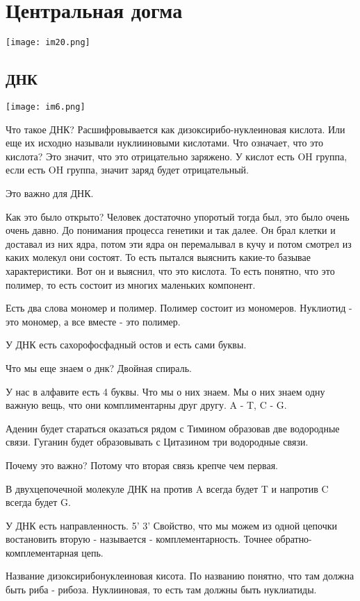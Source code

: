 \section{Центральная догма}

\texttt{[image: im20.png]}

\subsection{ДНК}
\texttt{[image: im6.png]}

Что такое ДНК? Расшифровывается как
дизоксирибо-нуклеиновая кислота. Или еще 
их исходно называли нуклииновыми кислотами. Что означает, что 
это кислота? Это значит, что это отрицательно заряжено. У кислот есть 
OH группа, если есть OH группа, значит заряд будет отрицательный.

Это важно для ДНК.

Как это было открыто? Человек достаточно упоротый тогда был, это было очень очень давно.
До понимания процесса генетики и так далее. Он брал клетки и доставал из
них ядра, потом эти ядра он перемалывал в кучу и потом
смотрел из каких молекул они состоят. То есть пытался выяснить какие-то
базывае характеристики. Вот он и выяснил, что это кислота. То есть понятно,
что это полимер, то есть состоит из многих маленьких компонент.

Есть два слова мономер и полимер. Полимер состоит из мономеров. 
Нуклиотид - это мономер, а все вместе - это полимер.

У ДНК есть сахорофосфадный остов и есть сами буквы.

Что мы еще знаем о днк? Двойная спираль. 

У нас в алфавите есть 4 буквы. Что мы о них знаем. Мы о них знаем одну важную вещь,
что они комплиментарны друг другу. A - T, C - G.

Аденин будет стараться оказаться рядом с Тимином образовав две водородные
связи. Гуганин будет образовывать с Цитазином три водородные связи.

Почему это важно? Потому что вторая связь крепче чем первая.

В двухцепочечной молекуле ДНК на против A всегда будет T и
напротив C всегда будет G.

У ДНК есть направленность. 5' 3' Свойство, что
мы можем из одной цепочки востановить вторую - называется - комплементарность.
Точнее обратно-комплементарная цепь. 

Название дизоксирибонуклеиновая кисота. По названию понятно, что там 
должна быть риба - рибоза. Нуклииновая, то есть там должны быть нуклиатиды. 

